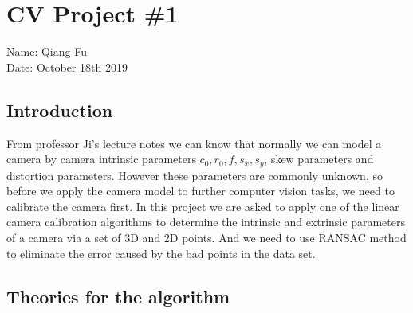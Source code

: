 \documentclass{article}
\begin{document}
\section*{CV Project \#1}
Name: Qiang Fu
\\Date: October 18th 2019

\subsection*{Introduction} %
From professor Ji's lecture notes we can know that normally we can model a camera by camera intrinsic parameters $c_0,r_0,f,s_x,s_y$, skew parameters and distortion parameters.\cite{ref1} However these parameters are commonly unknown, so before we apply the camera model to further computer vision tasks, we need to calibrate the camera first.
In this project we are asked to apply one of the linear camera calibration algorithms to determine the intrinsic and extrinsic parameters of a camera via  a set of 3D and 2D points. And we need to use RANSAC method to eliminate the error caused by the bad points in the data set.


\subsection*{Theories for the algorithm}
\end{document}
